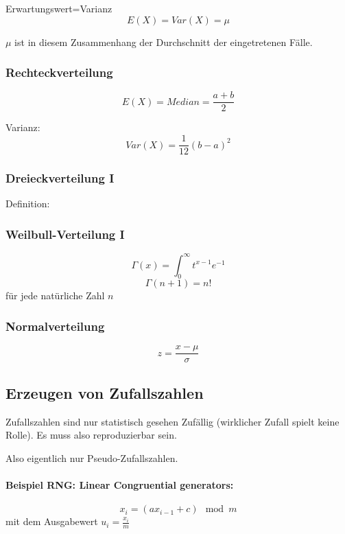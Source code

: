 Erwartungswert=Varianz
\[
	E(X) = Var(X) = \mu
\]

$\mu$ ist in diesem Zusammenhang der Durchschnitt der eingetretenen Fälle.

\subsubsection{Rechteckverteilung}

\[
	E(X) = Median = \frac{a+b}2
\]

Varianz:
\[
	Var(X) = \frac{1}{12}(b-a)^2
\]


\subsubsection{Dreieckverteilung I}

Definition:


\subsubsection{Weilbull-Verteilung I}



\[
	\Gamma(x) = \int^\infty_0 t^{x-1} e^{-1}
\]
\[
\Gamma(n+1) = n!
\]
für jede natürliche Zahl $n$

\subsubsection{Normalverteilung}



\[
	z = \frac{x - \mu}{\sigma}
\]


\subsection{Erzeugen von Zufallszahlen}

Zufallszahlen sind nur statistisch gesehen Zufällig (wirklicher Zufall spielt keine Rolle). Es muss also reproduzierbar sein.

Also eigentlich nur Pseudo-Zufallszahlen.

\paragraph{Beispiel RNG: Linear Congruential generators:}
\[
	x_i = (a x_{i-1} + c) \mod m
\]
mit dem Ausgabewert $u_i = \frac{x_i}{m}$

